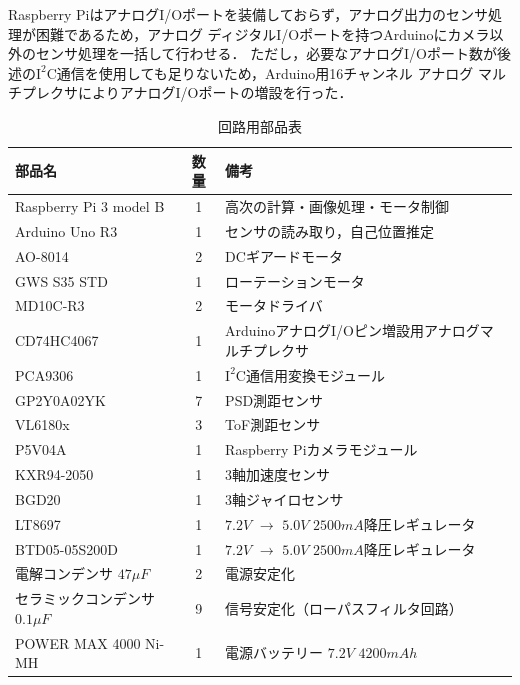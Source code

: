 \documentclass[11pt,a4]{jsarticle}
\begin{document}
    Raspberry PiはアナログI/Oポートを装備しておらず，アナログ出力のセンサ処理が困難であるため，アナログ ディジタルI/Oポートを持つArduinoにカメラ以外のセンサ処理を一括して行わせる．
    ただし，必要なアナログI/Oポート数が後述の$\mathrm{I^2C}$通信を使用しても足りないため，Arduino用16チャンネル アナログ マルチプレクサによりアナログI/Oポートの増設を行った．

    \begin{table}[h]
      \centering
      \caption{回路用部品表}
      \begin{tabular}{|l|c||l|} \hline
        部品名                 & 数量 & 備考                                               \\ \hline \hline
        Raspberry Pi 3 model B & 1    & 高次の計算・画像処理・モータ制御                   \\ \hline
        Arduino Uno R3         & 1    & センサの読み取り，自己位置推定                     \\ \hline
        AO-8014                & 2    & DCギアードモータ                                   \\ \hline
        GWS S35 STD            & 1    & ローテーションモータ                               \\ \hline
        MD10C-R3               & 2    & モータドライバ                                     \\ \hline
        CD74HC4067             & 1    & ArduinoアナログI/Oピン増設用アナログマルチプレクサ \\ \hline
        PCA9306                & 1    & $\mathrm{I^2C}$通信用変換モジュール                \\ \hline
        GP2Y0A02YK             & 7    & PSD測距センサ                                      \\ \hline
        VL6180x                & 3    & ToF測距センサ                                      \\ \hline
        P5V04A                 & 1    & Raspberry Piカメラモジュール                       \\ \hline
        KXR94-2050             & 1    & 3軸加速度センサ                                    \\ \hline
        BGD20                  & 1    & 3軸ジャイロセンサ                                  \\ \hline
        LT8697                 & 1    & $7.2\unit{V}$ $\rightarrow$ $5.0\unit{V}$ $2500\unit{mA}$降圧レギュレータ \\ \hline
        BTD05-05S200D          & 1    & $7.2\unit{V}$ $\rightarrow$ $5.0\unit{V}$ $2500\unit{mA}$降圧レギュレータ \\ \hline
        電解コンデンサ $47\unit{\mu F}$ & 2 & 電源安定化                                   \\ \hline
        セラミックコンデンサ $0.1\unit{\mu F}$ & 9 & 信号安定化（ローパスフィルタ回路）    \\ \hline
        POWER MAX 4000 Ni-MH   & 1    & 電源バッテリー $7.2\unit{V}$ $4200\unit{mAh}$      \\ \hline
      \end{tabular}
      \label{label::table::circuit_parts}
    \end{table}
\end{document}
